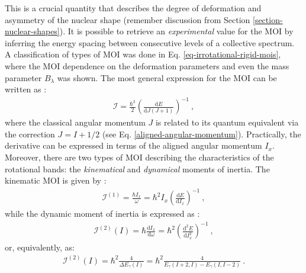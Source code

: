 This is a crucial quantity that describes the degree of deformation and asymmetry of the nuclear shape (remember discussion from Section \ref{section-nuclear-shapes}). It is possible to retrieve an \emph{experimental} value for the MOI by inferring the energy spacing between consecutive levels of a collective spectrum. A classification of types of MOI was done in Eq. \eqref{eq-irrotational-rigid-mois}, where the MOI dependence on the deformation parameters and even the mass parameter $B_\lambda$ was shown. The most general expression for the MOI can be written as \cite{ahmad2021backbending}:
\begin{align}
    \mathcal{I}=\frac{\hbar^2}{2}\left(\frac{\text{d}E}{\text{d}J(J+1)}\right)^{-1}\ ,
\end{align}
where the classical angular momentum $J$ is related to its quantum equivalent via the correction $J=I+1/2$ (see Eq. \eqref{aligned-angular-momentum}). Practically, the derivative can be expressed in terms of the aligned angular momentum $I_x$. Moreover, there are two types of MOI describing the characteristics of the rotational bands: the \emph{kinematical} and \emph{dynamical} moments of inertia. The kinematic MOI is given by \cite{wu1992relation}:
\begin{align}
    \mathcal{I}^{(1)}=\frac{\hbar I_x}{\omega}=\hbar^2 I_x\left(\frac{\text{d}E}{\text{d}I_x}\right)^{-1}\ ,
    \label{kinematic-moi-general}
\end{align}
while the dynamic moment of inertia is expressed as \cite{wu1992relation}:
\begin{align}
    \mathcal{I}^{(2)}(I)=\hbar\frac{\text{d}I_x}{\text{d}\omega}=\hbar^2\left(\frac{\text{d}^2E}{\text{d}I_x^2}\right)^{-1}\ ,
    \label{dynamic-moi-general}
\end{align}
or, equivalently, as:
\begin{align}
    \mathcal{I}^{(2)}(I)=\hbar^2\frac{4}{\Delta E_\gamma(I)}=\hbar^2\frac{4}{E_\gamma(I+2,I)-E_\gamma(I,I-2)}\ .
    \label{dynamic-moi-energy-levels}
\end{align}

